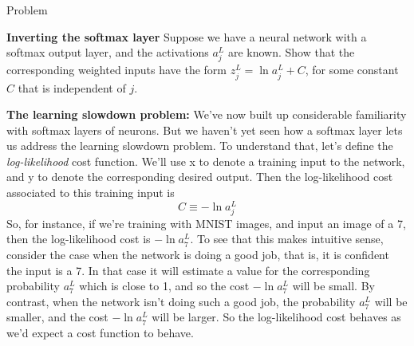 \documentclass[a4paper,twoside,10pt]{book}
\begin{document}
\begin{exercize}{Problem}
	\item \textbf{Inverting the softmax layer} Suppose we have a neural network with a softmax output layer, and the activations $a^L_j$ are known. Show that the corresponding weighted inputs have the form $z^L_j=\ln a^L_j+C$, for some constant $C$ that is independent of $j$.
\end{exercize}
\textbf{The learning slowdown problem:} We've now built up considerable familiarity with softmax layers of neurons. But we haven't yet seen how a softmax layer lets us address the learning slowdown problem. To understand that, let's define the \textit{log-likelihood} cost function. We'll use x to denote a training input to the network, and y to denote the corresponding desired output. Then the log-likelihood cost associated to this training input is
\begin{equation}
	C \equiv -\ln a^L_j
\label{eq:80}
\end{equation}
So, for instance, if we're training with MNIST images, and input an image of a 7, then the log-likelihood cost is $-\ln a^L_7$. To see that this makes intuitive sense, consider the case when the network is doing a good job, that is, it is confident the input is a 7. In that case it will estimate a value for the corresponding probability $a^L_7$ which is close to 1, and so the cost $-\ln a^L_7$ will be small. By contrast, when the network isn't doing such a good job, the probability $a^L_7$ will be smaller, and the cost $-\ln a^L_7$ will be larger. So the log-likelihood cost behaves as we'd expect a cost function to behave.
\end{document}
